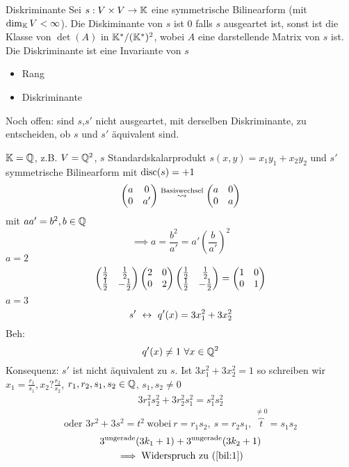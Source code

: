 \begin{Def}{Diskriminante}
  Sei $s:V\times V\to\mathbb{K}$ eine symmetrische Bilinearform (mit $\dim_{\mathbb{K}}V<\infty$). Die Diskiminante von $s$ ist 0 falls $s$ ausgeartet ist, sonst ist die Klasse von $\det(A)$ in $\mathbb{K}^*/( \mathbb{K}^*)^2$, wobei $A$ eine darstellende Matrix von $s$ ist. Die Diskriminante ist eine Invariante von $s$
  \begin{itemize}
    \item Rang
    \item Diskriminante
  \end{itemize}
\end{Def}
\begin{Bem}
  Noch offen: sind $s$,$s'$ nicht ausgeartet, mit derselben Diskriminante, zu entscheiden, ob $s$ und $s'$ äquivalent sind.
\end{Bem}
\begin{Bsp}
  $\mathbb{K}=\mathbb{Q}$, z.B. $V=\mathbb{Q}^2$, $s$ Standardskalarprodukt $s(x,y)=x_1y_1+x_2y_2$ und $s'$ symmetrische Bilinearform mit $\operatorname{disc}(s)=+1$
  \[\begin{pmatrix}a&0\\0&a'\end{pmatrix}\stackrel{\text{Basiswechsel}}{\rightsquigarrow}\begin{pmatrix}a&0\\0&a\end{pmatrix}\]
  mit $aa'=b^2, b\in \mathbb{Q}$
  \[\implies a=\frac{b^2}{a'}=a'\left( \frac{b}{a'} \right)^2\]
  $a=2$
  \[\begin{pmatrix}\frac{1}{2}&\frac{1}{2}\\\frac{1}{2}&-\frac{1}{2}\end{pmatrix}\begin{pmatrix}2&0\\0&2\end{pmatrix}\begin{pmatrix}\frac{1}{2}&\frac{1}{2}\\\frac{1}{2}&-\frac{1}{2}\end{pmatrix}=\begin{pmatrix}1&0\\0&1\end{pmatrix}\]
  $a=3$
  \[s'\ \leftrightarrow\ q'(x)=3x^2_1+3x^2_2\]
  Beh: \[q'(x)\neq 1\ \forall x\in \mathbb{Q}^2\]
  Konsequenz: $s'$ ist nicht äquivalent zu $s$. Ist $3x^2_1+3x^2_2=1$ so schreiben wir $x_1=\frac{r_1}{s_1},x_2?\frac{r_2}{s_2}$, $r_1,r_2,s_1,s_2\in\mathbb{Q}$, $s_1,s_2\neq 0$
  \begin{gather*}
    3r_1^2s_2^2+3r_2^2s_1^2=s^2_1s^2_2
  \end{gather*}
  \begin{equation}
    \text{oder }3r^2+3s^2=t^2\ \text{wobei}\ r=r_1s_2,\ s=r_2s_1,\ \overbrace{t}^{\neq 0}=s_1s_2
    \label{bil:1}
  \end{equation}
    \begin{gather*}
    3^\text{ungerade}(3k_1+1)+3^\text{ungerade}(3k_2+1)\\
    \implies \text{Widerspruch zu } (\ref{bil:1})
  \end{gather*}
\end{Bsp}
